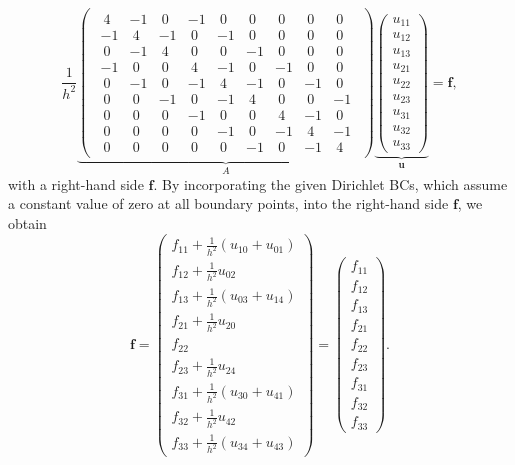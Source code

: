 \begin{equation}
\frac{1}{h^2} \underbrace{ \begin{pmatrix}
\begin{array}{ccc|ccc|ccc}~4&-1&~0&-1&~0&~0&~0&~0&~0\\-1&~4&-1&~0&-1&~0&~0&~0&~0\\~0&-1&~4&~0&~0&-1&~0&~0&~0\\\hline -1&~0&~0&~4&-1&~0&-1&~0&~0\\~0&-1&~0&-1&~4&-1&~0&-1&~0\\~0&~0&-1&~0&-1&~4&~0&~0&-1\\\hline ~0&~0&~0&-1&~0&~0&~4&-1&~0\\~0&~0&~0&~0&-1&~0&-1&~4&-1\\~0&~0&~0&~0&~0&-1&~0&-1&~4\end{array}
	\end{pmatrix}}_{\textstyle A}
\underbrace{
	\begin{pmatrix}
	u_{11} \\ u_{12} \\ u_{13} \\ u_{21} \\ u_{22} \\ u_{23} \\ u_{31} \\ u_{32} \\ u_{33}
\end{pmatrix}}_{\textstyle{\bm{u}}} = \bm f,
\label{eq:2D-poisson-assembled-matrix}
\end{equation}
with a right-hand side $\bm f$. 
By incorporating the given Dirichlet BCs, which assume a constant value of zero at all boundary points, into the right-hand side $\bm{f}$, we obtain
\begin{equation}
\bm f = \begin{pmatrix}
		f_{11} + \frac{1}{h^2} (u_{10} + u_{01}) \\f_{12} + \frac{1}{h^2} u_{02} \\ f_{13} + \frac{1}{h^2} (u_{03} + u_{14})  \\ f_{21} + \frac{1}{h^2} u_{20} \\ f_{22} \\ f_{23} + \frac{1}{h^2} u_{24} \\ f_{31} + \frac{1}{h^2} (u_{30} + u_{41}) \\ f_{32} + \frac{1}{h^2} u_{42} \\ f_{33} + \frac{1}{h^2} (u_{34} + u_{43})
\end{pmatrix} = \begin{pmatrix}
f_{11} \\
f_{12} \\ 
f_{13} \\ 
f_{21} \\ 
f_{22} \\
f_{23} \\
f_{31} \\ 
f_{32} \\
f_{33}
\end{pmatrix}.
\label{eq:2D-poisson-assembled-rhs}
\end{equation}
